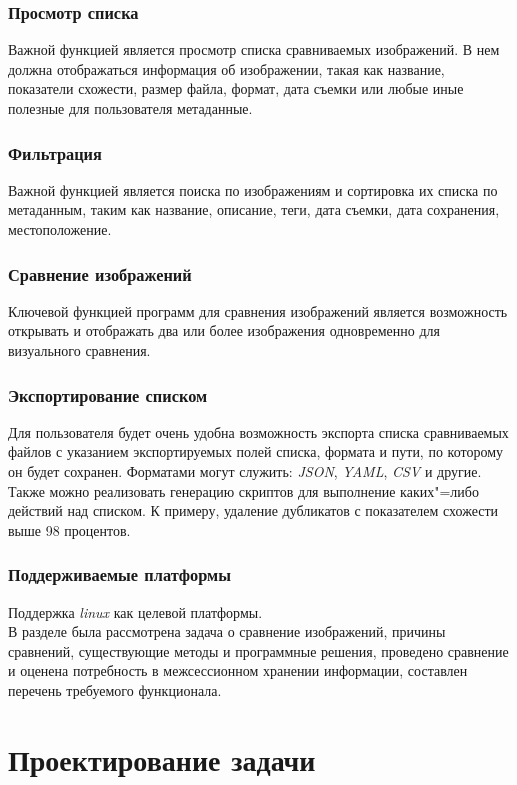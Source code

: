 \documentclass[variant=courcework]{bsuir}
\begin{document}
\subsection{Просмотр списка}
Важной функцией является просмотр списка сравниваемых изображений. В нем должна
отображаться информация об изображении, такая как название, показатели схожести,
размер файла, формат, дата съемки или любые иные полезные для пользователя
метаданные.

\subsection{Фильтрация}
Важной функцией является поиска по изображениям и сортировка их списка по
метаданным, таким как название, описание, теги, дата съемки, дата сохранения,
местоположение.

\subsection{Сравнение изображений}
Ключевой функцией программ для сравнения изображений является возможность
открывать и отображать два или более изображения одновременно для визуального
сравнения.

\subsection{Экспортирование списком}
Для пользователя будет очень удобна возможность экспорта списка сравниваемых
файлов с указанием экспортируемых полей списка, формата и пути, по которому он
будет сохранен. Форматами могут служить: \textit{JSON}, \textit{YAML},
\textit{CSV} и другие. Также можно реализовать генерацию скриптов для выполнение
каких"=либо действий над списком. К примеру, удаление дубликатов с показателем
схожести выше 98 процентов.

\subsection{Поддерживаемые платформы}
Поддержка \textit{linux} как целевой платформы.\\

В разделе была рассмотрена задача о сравнение изображений, причины сравнений,
существующие методы и программные решения, проведено сравнение и оценена
потребность в межсессионном хранении информации, составлен перечень требуемого
функционала.

\chapter{Проектирование задачи}
\end{document}
